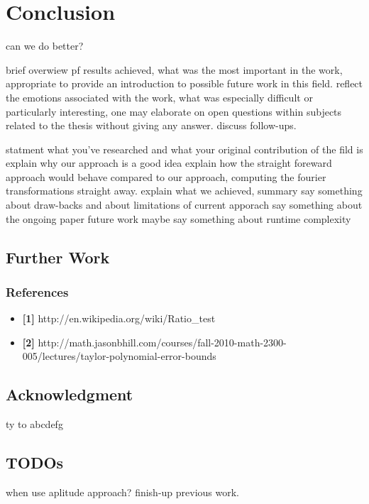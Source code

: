 \chapter{Conclusion}

can we do better?

brief overwiew pf results achieved, what was the most important in the work, appropriate to provide an introduction to possible future work in this field. reflect the emotions associated with the work, what was especially difficult or particularly interesting, one may elaborate on open questions within subjects related to the thesis without giving any answer. discuss follow-ups.

statment what you've researched and what your original contribution of the fild is
explain why our approach is a good idea
explain how the straight foreward approach would behave compared to our approach, computing the fourier transformations straight away.
explain what we achieved, summary
say something about draw-backs and about limitations of current apporach
say something about the ongoing paper future work
maybe say something about runtime complexity

\section{Further Work}
\subsection{References}
\begin{itemize}
\item \textbf{{[}1{]}} http://en.wikipedia.org/wiki/Ratio\_test
\item \textbf{{[}2{]}} http://math.jasonbhill.com/courses/fall-2010-math-2300-005/lectures/taylor-polynomial-error-bounds\end{itemize}
\section{Acknowledgment}
ty to abcdefg
\section{TODOs}

when use aplitude approach?
finish-up previous work.

